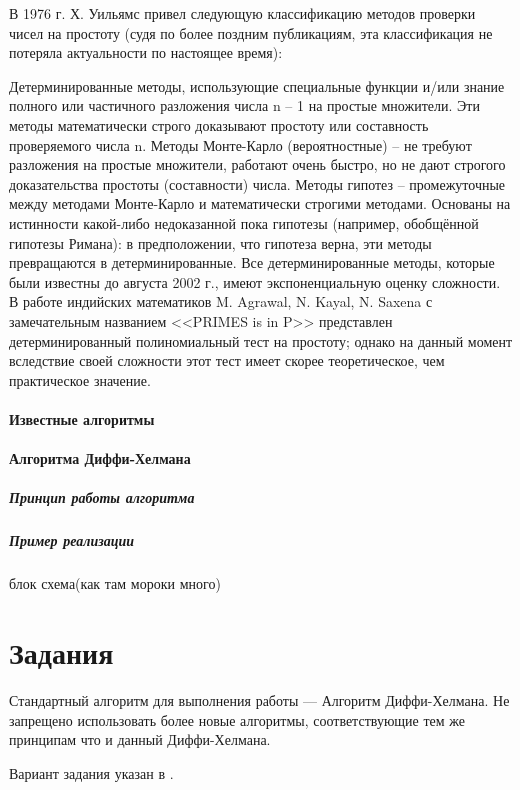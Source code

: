В 1976 г. Х. Уильямс привел следующую классификацию методов проверки чисел на
простоту (судя по более поздним публикациям, эта классификация не потеряла
актуальности по настоящее время):

Детерминированные методы, использующие специальные функции и/или знание
полного или частичного разложения числа n – 1 на простые множители. Эти
методы математически строго доказывают простоту или составность проверяемого
числа n. Методы Монте-Карло (вероятностные) – не требуют разложения на
простые множители, работают очень быстро, но не дают строгого доказательства
простоты (составности) числа. Методы гипотез – промежуточные между методами
Монте-Карло и математически строгими методами. Основаны на истинности
какой-либо недоказанной пока гипотезы (например, обобщённой гипотезы Римана):
в предположении, что гипотеза верна, эти методы превращаются в
детерминированные. Все детерминированные методы, которые были известны до
августа 2002 г., имеют экспоненциальную оценку сложности. В работе индийских
математиков M. Agrawal, N. Kayal, N. Saxena с замечательным названием
<<PRIMES is in P>> представлен детерминированный полиномиальный тест на
простоту; однако на данный момент вследствие своей сложности этот тест имеет
скорее теоретическое, чем практическое значение.

\paragraph{Известные алгоритмы}
%

\paragraph{Алгоритма Диффи-Хелмана}
%

\subparagraph{Принцип работы алгоритма}


\subparagraph{Пример реализации} блок схема(как там мороки много)

\section{Задания}\label{sect2_b}
%
Стандартный алгоритм для выполнения работы --- Алгоритм Диффи-Хелмана. Не
запрещено использовать более новые алгоритмы, соответствующие тем же
принципам что и данный Диффи-Хелмана.

Вариант задания указан в .

